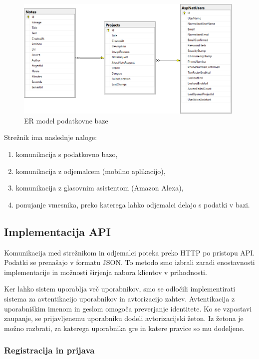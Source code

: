 \documentclass[a4paper, 12pt]{book}
\begin{document}
\begin{figure}[H]
\begin{center}
\includegraphics[width=11cm]{er_diagram_small}
\end{center}
\caption{ER model podatkovne baze}
\label{er_diagram}
\end{figure}


\noindent Strežnik ima naslednje naloge:
\begin{enumerate}
	\item komunikacija s podatkovno bazo,
	\item komunikacija z odjemalcem (mobilno aplikacijo),
	\item komunikacija z glasovnim asistentom (Amazon Alexa),
	\item ponujanje vmesnika, preko katerega lahko odjemalci delajo s podatki v bazi.
\end{enumerate}


\subsection{Implementacija API}

Komunikacija med strežnikom in odjemalci poteka preko HTTP po pristopu API.
Podatki se prenašajo v formatu JSON.
To metodo smo izbrali zaradi enostavnosti implementacije in možnosti širjenja nabora klientov v prihodnosti.

Ker lahko sistem uporablja več uporabnikov, smo se odločili implementirati sistema za avtentikacijo uporabnikov in avtorizacijo zahtev.
Avtentikacija z uporabniškim imenom in geslom omogoča preverjanje identitete.
Ko se vzpostavi zaupanje, se prijavljenemu uporabniku dodeli avtorizacijski žeton.
Iz žetona je možno razbrati, za katerega uporabnika gre in katere pravice so mu dodeljene.

\subsubsection{Registracija in prijava}
\end{document}
